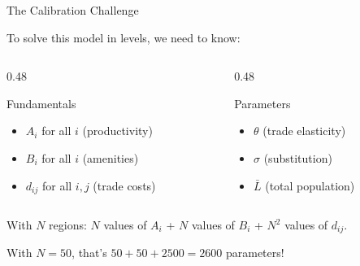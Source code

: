 \documentclass{beamer}
\begin{document}
\begin{frame}{The Calibration Challenge}

    To solve this model in levels, we need to know:

    \vspace{0.3em}
    \begin{columns}[T]
        \begin{column}{0.48\textwidth}
            \begin{block}{Fundamentals}
                \begin{itemize}
                    \item $A_i$ for all $i$ (productivity)
                    \item $B_i$ for all $i$ (amenities)
                    \item $d_{ij}$ for all $i,j$ (trade costs)
                \end{itemize}
            \end{block}
        \end{column}
        \begin{column}{0.48\textwidth}
            \begin{block}{Parameters}
                \begin{itemize}
                    \item $\theta$ (trade elasticity)
                    \item $\sigma$ (substitution)
                    \item $\bar{L}$ (total population)
                \end{itemize}
            \end{block}
        \end{column}
    \end{columns}

    \vspace{0.3em}
    With $N$ regions: $N$ values of $A_i$ + $N$ values of $B_i$ + $N^2$ values of $d_{ij}$.

    \vspace{0.2em}
     With $N = 50$, that's $50 + 50 + 2500 = 2600$ parameters!

\end{frame}
\end{document}
